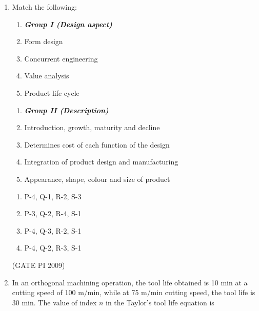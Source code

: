 \documentclass[journal,12pt,onecolumn]{IEEEtran}
\theoremstyle{remark}
\begin{document}
\begin{enumerate}
\begin{multicols}{2}
\begin{enumerate}
    \item P-2, Q-4, R-3, S-1
    \item P-4, Q-1, R-3, S-2
    \item P-2, Q-3, R-4, S-1
    \item P-4, Q-3, R-1, S-2
\end{enumerate}
\end{multicols}
\hfill (GATE PI 2009)
\item{Match the following:}
{
\setlength{\columnsep}{-2cm}
\begin{multicols}{2}
\begin{enumerate}[label=\Alph*.]
    \item[]  \textit{\textbf{Group I (Design aspect)}}
    \item Form design
    \item Concurrent engineering
    \item Value analysis
    \item Product life cycle
\end{enumerate}
\columnbreak
\begin{enumerate}[label=\arabic*.]
    \item[] \textit{\textbf{Group II (Description)}}
    \item Introduction, growth, maturity and decline
    \item Determines cost of each function of the design
    \item Integration of product design and manufacturing
    \item Appearance, shape, colour and size of product
\end{enumerate}
\end{multicols}
}
\begin{multicols}{2}
\begin{enumerate}
    \item P-4, Q-1, R-2, S-3
    \item P-3, Q-2, R-4, S-1
    \item P-4, Q-3, R-2, S-1
    \item P-4, Q-2, R-3, S-1
\end{enumerate}
\end{multicols}
\hfill (GATE PI 2009)
\item In an orthogonal machining operation, the tool life obtained is 10 min at a cutting speed of 100 m/min, while at 75 m/min cutting speed, the tool life is 30 min. The value of index $n$ in the Taylor's tool life equation is

\end{enumerate}
\end{document}
